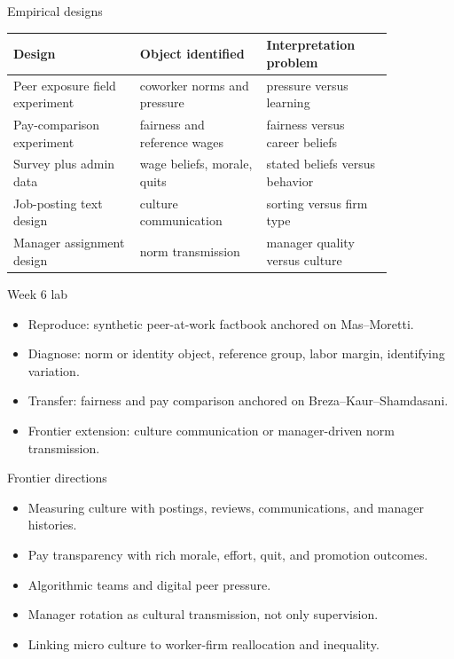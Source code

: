 \documentclass[aspectratio=169,11pt]{beamer}
\begin{document}
\begin{frame}{Empirical designs}
\scriptsize
\begin{tabular}{p{0.29\linewidth} p{0.28\linewidth} p{0.28\linewidth}}
\toprule
Design & Object identified & Interpretation problem \\
\midrule
Peer exposure field experiment & coworker norms and pressure & pressure versus learning \\
Pay-comparison experiment & fairness and reference wages & fairness versus career beliefs \\
Survey plus admin data & wage beliefs, morale, quits & stated beliefs versus behavior \\
Job-posting text design & culture communication & sorting versus firm type \\
Manager assignment design & norm transmission & manager quality versus culture \\
\bottomrule
\end{tabular}
\end{frame}

\begin{frame}{Week 6 lab}
\begin{itemize}
    \item Reproduce: synthetic peer-at-work factbook anchored on Mas--Moretti.
    \item Diagnose: norm or identity object, reference group, labor margin, identifying variation.
    \item Transfer: fairness and pay comparison anchored on Breza--Kaur--Shamdasani.
    \item Frontier extension: culture communication or manager-driven norm transmission.
\end{itemize}
\end{frame}

\begin{frame}{Frontier directions}
\begin{itemize}
    \item Measuring culture with postings, reviews, communications, and manager histories.
    \item Pay transparency with rich morale, effort, quit, and promotion outcomes.
    \item Algorithmic teams and digital peer pressure.
    \item Manager rotation as cultural transmission, not only supervision.
    \item Linking micro culture to worker-firm reallocation and inequality.
\end{itemize}
\end{frame}
\end{document}
